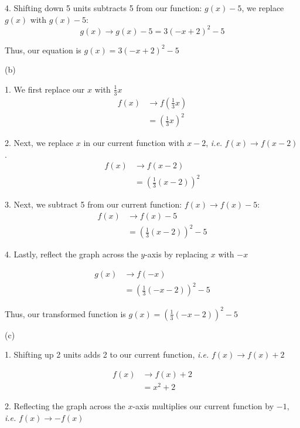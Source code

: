 4. Shifting down 5 units subtracts 5 from our function: $g(x) - 5$,  we replace $g(x)$ with $g(x) - 5$:
\[
g(x) \rightarrow g(x) - 5 = 3(-x+2)^2-5
\]

Thus, our equation is $\boxed{g(x) = 3(-x+2)^2-5}$ \newline 

(b)  \newline 

1. We first replace our $x$ with $\frac{1}{3}x$
\begin{align*}
    f(x) &\rightarrow f\left(\tfrac{1}{3}x\right) \\
    &= \left(\tfrac{1}{3}x\right)^2
\end{align*}

2. Next, we replace $x$ in our current function with $x-2$, \textit{i.e.} $f(x) \rightarrow f(x-2)$.
\begin{align*}
    f(x) &\rightarrow f(x-2) \\
    &= \left(\tfrac{1}{3}(x-2)\right)^2
\end{align*}

3. Next, we subtract 5 from our current function: $f(x) \rightarrow f(x)-5$:
\begin{align*}
    f(x) &\rightarrow f(x)-5 \\
    &= \left(\tfrac{1}{3}(x-2)\right)^2-5
\end{align*}

4. Lastly, reflect the graph across the $y$-axis by replacing $x$ with $-x$

\begin{align*}
    g(x) &\rightarrow f(-x) \\
    &= \left(\tfrac{1}{3}(-x-2)\right)^2-5
\end{align*}

Thus, our transformed function is $\boxed{g(x) = \left(\tfrac{1}{3}(-x-2)\right)^2-5}$

\bigskip 

(c) \newline 

1. Shifting up 2 units adds 2 to our current function, \textit{i.e.} $f(x) \rightarrow f(x) + 2$

\begin{align*}
    f(x) &\rightarrow f(x) + 2 \\
    &= x^2 + 2
\end{align*}

2. Reflecting the graph across the $x$-axis multiplies our current function by $-1$, \textit{i.e.} $f(x) \rightarrow -f(x)$

